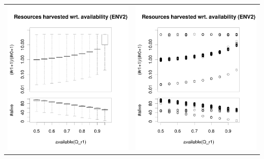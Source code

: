 \documentclass[a4paper,10pt]{article}
\begin{document}
\begin{table}[ht]
\begin{tabular}{cc}
\includegraphics[width=\imgSize]{images/5StaticEnv/ratioAndRep_staticEnv2LogY}&\includegraphics[width=\imgSize]{images/5StaticEnv/ratioAndRep_staticEnvPlot2LogY}\\

\end{tabular}
\end{table}
\end{document}
